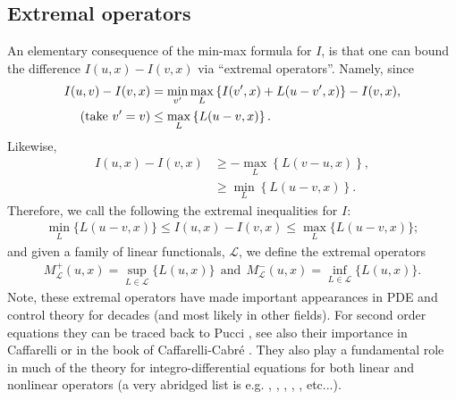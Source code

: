 \documentclass[11pt,reqno]{amsart}
\numberwithin{equation}{section}
\theoremstyle{plain}
\begin{document}

\subsection{Extremal operators}\label{sec:ExtremalOperators}

An elementary consequence of the min-max formula for $I$, is that one can bound the difference $I(u,x)-I(v,x)$ via ``extremal operators''. Namely, since
  \begin{align*}	
    I(u,v)-I(v,x) & = \min \limits_{v'}\max\limits_{L} \left \{ I(v',x)+L(u-v',x)\right \} -  I(v,x),\\
	 \textnormal{(take } v'=v \textnormal{)} & \leq \max\limits_{L} \left \{ L(u-v,x)\right\}.	
  \end{align*}	
  Likewise,
  \begin{align*}
    I(u,x)-I(v,x) & \geq -\max\limits_{L} \left \{ L(v-u,x)\right \},\\
	  & \geq \min \limits_{L} \left \{ L(u-v,x)\right \}.
  \end{align*}	  
  Therefore, we call the following the extremal inequalities for $I$:
  \begin{align}\label{eqMMonM:ExtremalInequality}
    \min\limits_{L} \{L(u-v,x)\}\leq I(u,x)-I(v,x) \leq \max \limits_{L} \{L(u-v,x)\};	
  \end{align}	
and given a family of linear functionals, $\mathcal{L}$, we define the extremal operators
  \begin{align}\label{eqMMonM:ExtremalOpDef}
    M^+_{\mathcal{L}}(u,x) = \sup\limits_{L\in\mathcal{L}} \{ L(u,x)\}
	\ \ \text{and}\ \ 
    M^-_{\mathcal{L}}(u,x) = \inf\limits_{L\in\mathcal{L}} \{ L(u,x)\}.
  \end{align}
  Note, these extremal operators have made important appearances in PDE and control theory for decades (and most likely in other fields).  For second order equations they can be traced back to Pucci \cite{Pucci-1965SuLeEquazioniEstremanti}, see also their importance in Caffarelli \cite{Caff-1989InteriorEstimates} or in the book of Caffarelli-Cabr\'e \cite[Chp 2-4]{CaCa-95}.  They also play a fundamental role in much of the theory for integro-differential equations for both linear and nonlinear operators (a very abridged list is e.g. \cite{CaSi-09RegularityIntegroDiff},  \cite{ChDa-2012NonsymKernels}, \cite{ChDa-2012RegNonlocalParabolicCalcVar}, \cite{KassRangSchwa-2013RegularityDirectionalINDIANA}, \cite{SchwabSilvestre-2014RegularityIntDiffVeryIrregKernelsAPDE}, etc...).
\end{document}
